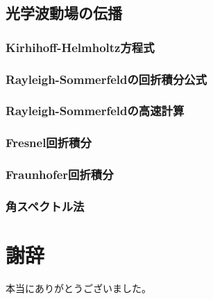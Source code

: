 \documentclass[dvipdfmx,autodetect-engine]{jreport}
\begin{document}
\section{光学波動場の伝播}
\subsection{Kirhihoff-Helmholtz方程式}

\subsection{Rayleigh-Sommerfeldの回折積分公式}

\subsection{Rayleigh-Sommerfeldの高速計算}

\subsection{Fresnel回折積分}

\subsection{Fraunhofer回折積分}

\subsection{角スペクトル法}

\newpage



\chapter*{謝辞}
本当にありがとうございました。
\end{document}
